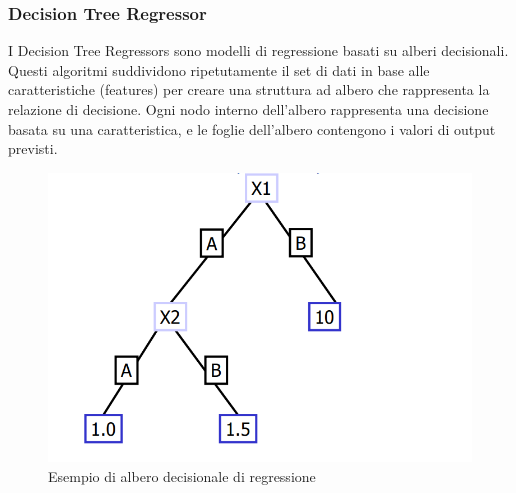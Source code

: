\subsubsection{Decision Tree Regressor}

I Decision Tree Regressors sono modelli di regressione basati su alberi decisionali. Questi algoritmi suddividono ripetutamente il set di dati in base alle caratteristiche (features) per creare una struttura ad albero che rappresenta la relazione di decisione. Ogni nodo interno dell'albero rappresenta una decisione basata su una caratteristica, e le foglie dell'albero contengono i valori di output previsti.
\begin{figure}[H]
    \centering
    \includegraphics[scale=0.5]{images/DecisionTreeRegressor.png}
    \caption*{Esempio di albero decisionale di regressione}
\end{figure}

